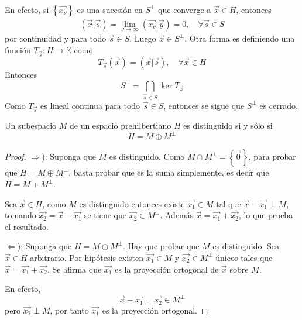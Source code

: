 \documentclass[12pt]{report}
\newcounter{it}
\theoremstyle{largebreak}
\newcommand\cf[3]{\ensuremath{#1:#2\rightarrow#3}}
\newcommand\pint[2]{\ensuremath{\left(#1\big| #2\right)}}
\begin{document}
    \begin{sol}
        En efecto, si $\left\{\vec{x_\nu} \right\}$ es una sucesión en $S^\perp$ que converge a $\vec{x}\in H$, entonces
        \begin{equation*}
            \begin{split}
                \pint{\vec{x}}{\vec{s}}=\lim_{\nu\rightarrow\infty}\pint{\vec{x_\nu}}{\vec{y}}=0,\quad\forall\vec{s}\in S
            \end{split}
        \end{equation*}
        por continuidad y para todo $\vec{s}\in S$. Luego $\vec{x}\in S^\perp$. Otra forma es definiendo una función $\cf{T_{\vec{s}}}{H}{\mathbb{K}}$ como
        \begin{equation*}
            T_{\vec{s}}(\vec{x})=\pint{\vec{x}}{\vec{s}},\quad\forall\vec{x}\in H
        \end{equation*}
        Entonces
        \begin{equation*}
            S^\perp=\bigcap_{\vec{s}\in S}\ker T_{\vec{s}}
        \end{equation*}
        Como $T_{\vec{s}}$ es lineal continua para todo $\vec{s}\in S$, entonces se sigue que $S^\perp$ es cerrado.
    \end{sol}

    \begin{propo}
        Un subespacio $M$ de un espacio prehilbertiano $H$ es distinguido si y sólo si
        \begin{equation*}
            H=M\oplus M^\perp
        \end{equation*}
    \end{propo}

    \begin{proof}
        $\Rightarrow$): Suponga que $M$ es distinguido. Como $M\cap M^\perp=\left\{\vec{0} \right\}$, para probar que $H=M\oplus M^\perp$, basta probar que es la suma simplemente, es decir que $H=M+M^\perp$.
        
        Sea $\vec{x}\in H$, como $M$ es distinguido entonces existe $\vec{x_1}\in M$ tal que $\vec{x}-\vec{x_1}\perp M$, tomando $\vec{x_2}=\vec{x}-\vec{x_1}$ se tiene que $\vec{x_2}\in M^\perp$. Además $\vec{x}=\vec{x_1}+\vec{x_2}$, lo que prueba el resultado.

        $\Leftarrow$): Suponga que $H=M\oplus M^\perp$. Hay que probar que $M$ es distinguido. Sea $\vec{x}\in H$ arbitrario. Por hipótesis existen $\vec{x_1}\in M$ y $\vec{x_2}\in M^\perp$ únicos tales que $\vec{x}=\vec{x_1}+\vec{x_2}$. Se afirma que $\vec{x_1}$ es la proyección ortogonal de $\vec{x}$ sobre $M$. 
        
        En efecto,
        \begin{equation*}
            \vec{x}-\vec{x_1}=\vec{x_2}\in M^\perp
        \end{equation*}
        pero $\vec{x_2}\perp M$, por tanto $\vec{x_1}$ es la proyección ortogonal.
    \end{proof}
\end{document}
